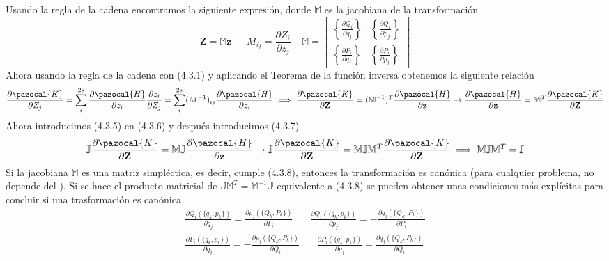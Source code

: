 Usando la regla de la cadena encontramos la siguiente expresión, donde $\mathbb{M}$ es la jacobiana de la transformación
\begin{equation} \label{4.2.7}
    \dot{\mathbf{Z}} = \mathbb{M}\dot{\mathbf{z}}  \ \ \ \ \ \ \ M_{ij} = \frac{\partial Z_i}{\partial z_j} \ \ \ \ \ \mathbb{M} = \left[\begin{array}{cc} \left\{\frac{\partial Q_i}{\partial q_j}\right\} & \left\{\frac{\partial Q_i}{\partial p_j}\right\} \\  \left\{\frac{\partial P_i}{\partial q_j}\right\} & \left\{\frac{\partial P_i}{\partial p_j}\right\} \end{array}\right]
\end{equation} 
Ahora usando la regla de la cadena con (4.3.1) y aplicando el Teorema de la función inversa obtenemos la siguiente relación 
\begin{equation} \label{4.2.7}
    \frac{\partial \pazocal{K}}{\partial Z_j} = \sum_i^{2s} \frac{\partial \pazocal{H}}{\partial z_i} \frac{\partial z_i}{\partial Z_j} = \sum_i^{2s} ({M^{-1}})_{ij} \frac{\partial \pazocal{H}}{\partial z_i} \implies \frac{\partial \pazocal{K}}{\partial \mathbf{Z}} = (\mathbb{M}^{-1})^T \frac{\partial \pazocal{H}}{\partial \mathbf{z}} \rightarrow  \frac{\partial \pazocal{H}}{\partial \mathbf{z}}  = \mathbb{M}^T \frac{\partial \pazocal{K}}{\partial \mathbf{Z}}
\end{equation} 
Ahora introducimos (4.3.5) en (4.3.6) y después introducimos (4.3.7)
\begin{equation} \label{4.2.7}
    \mathbb{J} \frac{\partial \pazocal{K}}{\partial \mathbf{Z}} = \mathbb{M}\mathbb{J} \frac{\partial \pazocal{H}}{\partial \mathbf{z}} \rightarrow \mathbb{J} \frac{\partial \pazocal{K}}{\partial \mathbf{Z}} = \mathbb{M}\mathbb{J} \mathbb{M}^T \frac{\partial \pazocal{K}}{\partial \mathbf{Z}} \implies \mathbb{M}\mathbb{J} \mathbb{M}^T = \mathbb{J} 
\end{equation} 
Si la jacobiana $\mathbb{M}$ es una matriz simpléctica, es decir, cumple (4.3.8), entonces la transformación es canónica (para cualquier problema, no depende del ).
\newpage
Si se hace el producto matricial de $\mathbb{J} \mathbb{M}^T = \mathbb{M}^{-1}\mathbb{J}$ equivalente a (4.3.8) se pueden obtener unas condiciones más explícitas para concluir si una trasformación es canónica
\begin{equation} \label{4.2.7}
    \begin{split}
        \frac{\partial Q_i(\{q_k,p_k\})}{\partial q_j} = \frac{\partial p_j(\{Q_k,P_k\})}{\partial P_i} \ \ \ \ \ \ \ \ \frac{\partial Q_i(\{q_k,p_k\})}{\partial p_j} = -\frac{\partial q_j(\{Q_k,P_k\})}{\partial P_i} \\ 
        \frac{\partial P_i(\{q_k,p_k\})}{\partial q_j} = -\frac{\partial p_j(\{Q_k,P_k\})}{\partial Q_i} \ \ \ \ \ \ \ \ \frac{\partial P_i(\{q_k,p_k\})}{\partial p_j} = \frac{\partial q_j(\{Q_k,P_k\})}{\partial Q_i}
    \end{split}
\end{equation} 
